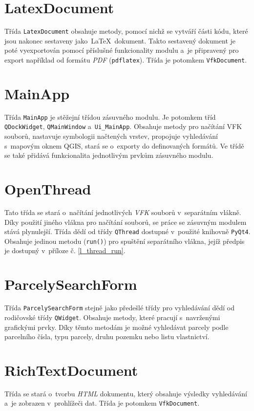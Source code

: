 \documentclass[a4paper,12pt,oneside]{book}
\newcommand{\latex}{\LaTeX}
\begin{document}
\section*{LatexDocument}
Třída \texttt{LatexDocument} obsahuje metody, pomocí nichž se vytváří
části kódu, které jsou nakonec sestaveny jako~\latex~dokument. Takto
sestavený dokument je poté vyexportován pomocí příslušné funkcionality
modulu a~je připravený pro export například od formátu \textit{PDF}
(\texttt{pdflatex}). Třída je potomkem \texttt{VfkDocument}.

\section*{MainApp}
Třída \texttt{MainApp} je stěžejní třídou zásuvného modulu. Je
potomkem tříd \texttt{QDockWidget}, \texttt{QMainWindow}
a~\texttt{Ui\_MainApp}. Obsahuje metody pro načítání VFK souborů,
nastavuje symbologii načtených vrstev, propojuje vyhledávání s~mapovým
oknem QGIS, stará se o~exporty do definovaných formátů. Ve třídě se
také přidává funkcionalita jednotlivým prvkům zásuvného modulu.

\section*{OpenThread}
Tato třída se stará o~načítání jednotlivých \textit{VFK} souborů
v~separátním vlákně. Díky použití jiného vlákna pro načítání souborů,
se práce se zásuvným modulem stává plynulejší. Třída dědí od třídy
\texttt{QThread} dostupné v~použité knihovně \texttt{PyQt4}. Obsahuje
jedinou metodu (\texttt{run()}) pro spuštění separátního vlákna,
jejíž předpis je dostupný v~příloze č. \ref{l_thread_run}.

\section*{ParcelySearchForm}
Třída \texttt{ParcelySearchForm} stejně jako předešlé třídy pro
vyhledávání dědí od rodičovské třídy \texttt{QWidget}. Obsahuje
metody, které pracují s~navrženými grafickými prvky. Díky těmto
metodám je možné vyhledávat parcely podle parcelního čísla, typu
parcely, druhu pozemku nebo listu vlastnictví.

\section*{RichTextDocument}
Třída se stará o~tvorbu \textit{HTML} dokumentu, který obsahuje
výsledky vyhledávání a~je zobrazen v~prohlížeči dat. Třída je potomkem
\texttt{VfkDocument}.
\end{document}
